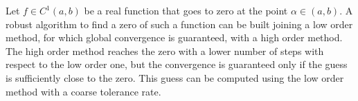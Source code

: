 Let $f \in C^{1} \left( a, b \right)$ be a real function that goes to zero at
the point $\alpha\in (a, b)$. A robust algorithm to find a zero of such a
function can be built joining a low order method, for which global convergence
is guaranteed, with a high order method. The high order method reaches the
zero with a lower number of steps with respect to the low order one, but the
convergence is guaranteed only if the guess is sufficiently close to the zero.
This guess can be computed using the low order method with a coarse tolerance
rate.
